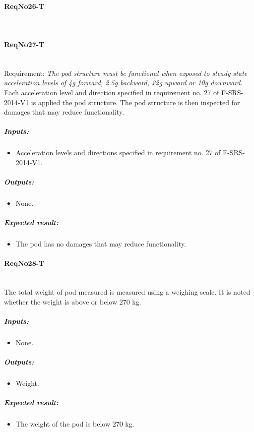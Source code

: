 \paragraph{ReqNo26-T}\mbox{}\\ %

\paragraph{ReqNo27-T}\mbox{}\\ %
Requirement: \textit{The pod structure must be functional when exposed to steady state acceleration levels of 4g forward, 2.5g backward, 22g upward or 10g downward.}
\\
Each acceleration level and direction specified in requirement no. 27 of F-SRS-2014-V1 is applied the pod structure. The pod structure is then inspected for damages that may reduce functionality.

	\subparagraph{Inputs:}
	\begin{itemize}
	\item Acceleration levels and directions specified in requirement no. 27 of F-SRS-2014-V1.
	\end{itemize}
	\subparagraph{Outputs:}
	\begin{itemize}
	\item None.
	\end{itemize}
	\subparagraph{Expected result:}
	\begin{itemize}
	\item The pod has no damages that may reduce functionality.
	\end{itemize}


\paragraph{ReqNo28-T}\mbox{}\\ %
The total weight of pod measured is measured using a weighing scale. It is noted whether the weight is above or below 270 kg.
\\
	\subparagraph{Inputs:}
	\begin{itemize}
	\item None.
	\end{itemize}
	\subparagraph{Outputs:}
	\begin{itemize}
	\item Weight.
	\end{itemize}
	\subparagraph{Expected result:}
	\begin{itemize}
	\item The weight of the pod is below 270 kg.
	\end{itemize}


